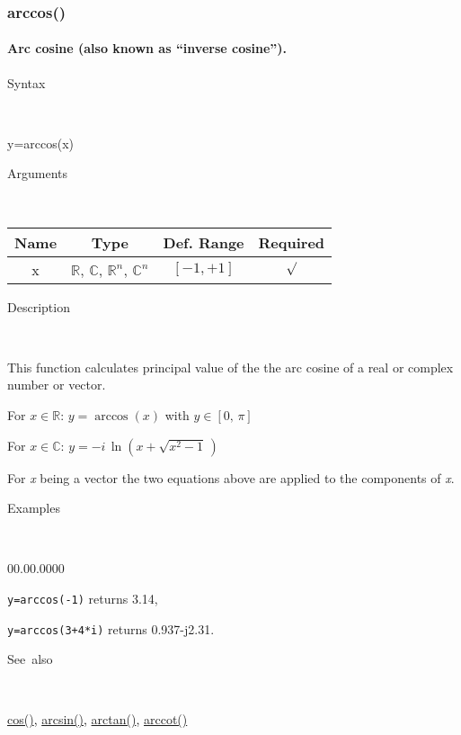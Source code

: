 \newpage
{}


\subsubsection*{\hypertarget{arccos}{}{\Large arccos()}}


\paragraph{\label{par:Arc-cosine}Arc cosine (also known as {}``inverse cosine'').}

\begin{description}
\item [Syntax]~
\end{description}
y=arccos(x)

\begin{description}
\item [Arguments]~
\end{description}
\begin{tabular}{|c|c|c|c|}
\hline 
Name&
Type&
Def. Range&
Required\tabularnewline
\hline
\hline 
x&
$\mathbb{R}$, $\mathbb{C}$, $\mathbb{R}^{n}$, $\mathbb{C}^{n}$&
$\left[-1,+1\right]$&
$\surd$\tabularnewline
\hline
\end{tabular}

\begin{description}
\item [Description]~
\end{description}
This function calculates principal value of the the arc cosine of
a real or complex number or vector.

\medskip{}
For $x\in\mathbb{R}$: $y=\arccos\left(x\right)$ with $y\in\left[0,\,\pi\right]$

\medskip{}
For $x\in\mathbb{C}$: $y=-i\,\ln\left(x+\sqrt{x^{2}-1}\,\right)$
\medskip{}

For \textit{x} being a vector the two equations above are
applied to the components of \textit{x}.

\begin{description}
\item [Examples]~
\end{description}
\begin{lyxlist}{00.00.0000}
\item [\texttt{y=arccos(-1)}]returns 3.14,
\item [\texttt{y=arccos(3+4{*}i)}]returns 0.937-j2.31.
\end{lyxlist}
\begin{description}
\item [See~also]~
\end{description}
\textcolor{blue}{\hyperlink{cos}{cos()}}\textcolor{black}{,} \textcolor{blue}{\hyperlink{arcsin}{arcsin()}}\textcolor{black}{,}
\textcolor{blue}{\hyperlink{arctan}{arctan()}}\textcolor{black}{,}
\textcolor{blue}{\hyperlink{arccot}{arccot()}}

